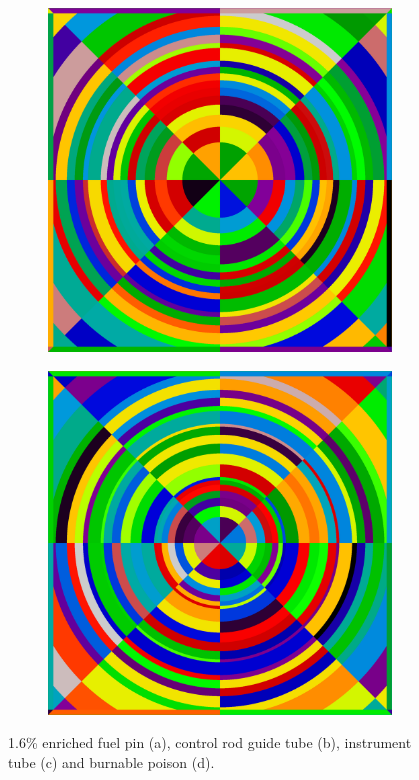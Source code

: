 \begin{figure}[h!]
\begin{subfigure}{.5\textwidth}
  \caption{}
  \label{fig:chap8-pin-crgt}
\end{subfigure}
\begin{subfigure}{.5\textwidth}
  \centering
  \includegraphics[width=0.9\linewidth]{figures/quantification/fsrs-instr-tube}
  \caption{}
  \label{fig:chap8-instr-tube}
\end{subfigure}%
\begin{subfigure}{.5\textwidth}
  \centering
  \includegraphics[width=0.9\linewidth]{figures/quantification/fsrs-bp}
  \caption{}
  \label{fig:chap8-bp}
\end{subfigure}%
\caption[BEAVRS pin cell FSR discretization]{1.6\% enriched fuel pin (a), control rod guide tube (b), instrument tube (c) and burnable poison (d).}
\label{fig:chap8-pin-cell-fsrs}
\end{figure}

